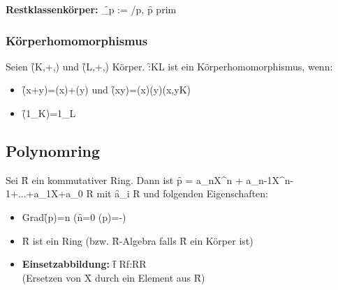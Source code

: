 \noindent{}\textbf{Restklassenkörper:} \f{_p :=  /p}, \f{p \in {}} prim
\subsubsection*{Körperhomomorphismus}
Seien \f{(K,+,\cdot)} und \f{(L,+,\cdot)} Körper. \f{\Phi:K\rightarrow L} ist ein Körperhomomorphismus, wenn:
\begin{itemize}
    \item \f{\Phi (x+y)=\Phi(x)+\Phi(y)} und \f{\Phi(x\cdot y)=\Phi(x)\cdot\Phi(y)\quad(\forall x,y\in K)}
    \item \f{\Phi(1_K)=1_L}
\end{itemize}

\subsection{Polynomring}
Sei \f{R} ein kommutativer Ring. Dann ist \f{p = a_nX^n + a_{n-1}X^{n-1}+...+a_1X+a_0 \in R\left[X\right] } mit \f{a_i \in R} und folgenden Eigenschaften:
\begin{itemize}
    \item Grad\f{(p)=n\quad} (\f{n=0 \Rightarrow {}(p)=-\infty}) 
    \item \f{R\left[X\right] } ist ein Ring (bzw. \f{R}-Algebra falls \f{R} ein Körper ist)
    \item \textbf{Einsetzabbildung:} \f{f \in R\left[X\right] \mapsto f:R\rightarrow R\quad}\\
    (Ersetzen von \f{X} durch ein Element aus \f{R}) 
\end{itemize}
\newpage